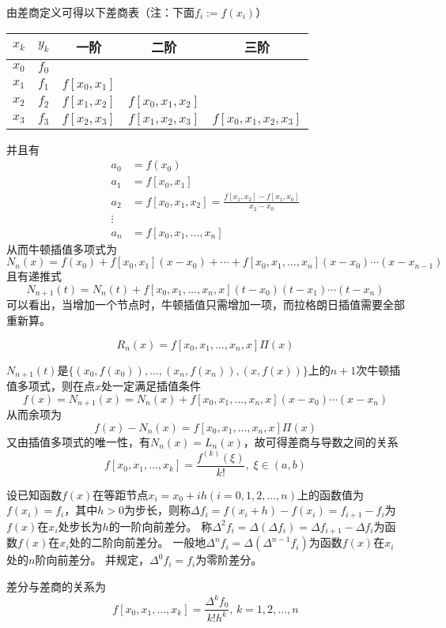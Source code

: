 由差商定义可得以下差商表（注：下面$f_i:=f(x_i)$）
\begin{center}
\begin{tabular}{ccccc}\hline
$x_k$ & $y_k$ & 一阶 & 二阶 & 三阶\\\hline
$x_0$ & \underline{$f_0$} & & &\\
$x_1$ & $f_1$ & \underline{$f[x_0,x_1]$} & &\\
$x_2$ & $f_2$ & $f[x_1,x_2]$ & \underline{$f[x_0,x_1,x_2]$} &\\
$x_3$ & $f_3$ & $f[x_2,x_3]$ & $f[x_1,x_2,x_3]$ & \underline{$f[x_0,x_1,x_2,x_3]$} \\\hline
\end{tabular}
\end{center}
并且有
\[\begin{aligned}
a_0&=f(x_0)\\
a_1&=f[x_0,x_1]\\
a_2&=f[x_0,x_1,x_2]=\frac{f[x_1,x_2]-f[x_1,x_0]}{x_2-x_0}\\
\vdots\\
a_n&=f[x_0,x_1,\ldots,x_n]
\end{aligned}\]
从而牛顿插值多项式为
\[N_n(x)=f(x_0)+f[x_0,x_1](x-x_0)+\cdots+f[x_0,x_1,\ldots,x_n](x-x_0)\cdots(x-x_{n-1})\]
且有递推式
\[N_{n+1}(t)=N_n(t)+f[x_0,x_1,\ldots,x_n,x](t-x_0)(t-x_1)\cdots(t-x_n)\]
可以看出，当增加一个节点时，牛顿插值只需增加一项，而拉格朗日插值需要全部重新算。

\begin{theorem}[Newton多项式的误差估计]
    \[R_n(x)=f[x_0,x_1,\ldots,x_n,x]\Pi(x)\]
\end{theorem}
\begin{analysis}
    $N_{n+1}(t)$是$\{(x_0,f(x_0)),\ldots,(x_n,f(x_n)),(x,f(x))\}$上的$n+1$次牛顿插值多项式，则在点$x$处一定满足插值条件
    \[f(x)=N_{n+1}(x)=N_n(x)+f[x_0,x_1,\ldots,x_n,x](x-x_0)\cdots(x-x_n)\]
    从而余项为
    \[f(x)-N_n(x)=f[x_0,x_1,\ldots,x_n,x]\Pi(x)\]
    又由插值多项式的唯一性，有$N_n(x)=L_n(x)$，故可得差商与导数之间的关系
    \[f[x_0,x_1,\ldots,x_k]=\frac{f^{(k)}(\xi)}{k!},\;\xi\in(a,b)\]
\end{analysis}

\begin{definition}[差分]
设已知函数$f(x)$在等距节点$x_i=x_0+ih(i=0,1,2,\ldots,n)$上的函数值为$f(x_i)=f_i$，其中$h>0$为步长，则称$\Delta f_i=f(x_i+h)-f(x_i)=f_{i+1}-f_i$为$f(x)$在$x_i$处步长为$h$的一阶向前差分。
称$\Delta^2 f_i=\Delta(\Delta f_i)=\Delta f_{i+1}-\Delta f_i$为函数$f(x)$在$x_i$处的二阶向前差分。
一般地$\Delta^n f_i=\Delta(\Delta^{n-1} f_i)$为函数$f(x)$在$x_i$处的$n$阶向前差分。
并规定，$\Delta^0 f_i=f_i$为零阶差分。
\end{definition}
\par 差分与差商的关系为
\[f[x_0,x_1,\ldots,x_k]=\frac{\Delta^k f_0}{k!h^k},\,k=1,2,\ldots,n\]

